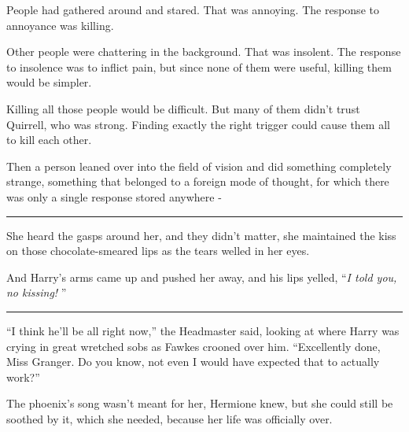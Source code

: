 People had gathered around and stared. That was annoying. The response
to annoyance was killing.

Other people were chattering in the background. That was insolent. The
response to insolence was to inflict pain, but since none of them were
useful, killing them would be simpler.

Killing all those people would be difficult. But many of them didn't
trust Quirrell, who was strong. Finding exactly the right trigger could
cause them all to kill each other.

Then a person leaned over into the field of vision and did something
completely strange, something that belonged to a foreign mode of
thought, for which there was only a single response stored anywhere -

\begin{center}\rule{3in}{0.4pt}\end{center}

She heard the gasps around her, and they didn't matter, she maintained
the kiss on those chocolate-smeared lips as the tears welled in her
eyes.

And Harry's arms came up and pushed her away, and his lips yelled,
``\emph{I told you, no kissing!} ''

\begin{center}\rule{3in}{0.4pt}\end{center}

``I think he'll be all right now,'' the Headmaster said, looking at
where Harry was crying in great wretched sobs as Fawkes crooned over
him. ``Excellently done, Miss Granger. Do you know, not even I would
have expected that to actually work?''

The phoenix's song wasn't meant for her, Hermione knew, but she could
still be soothed by it, which she needed, because her life was
officially over.
